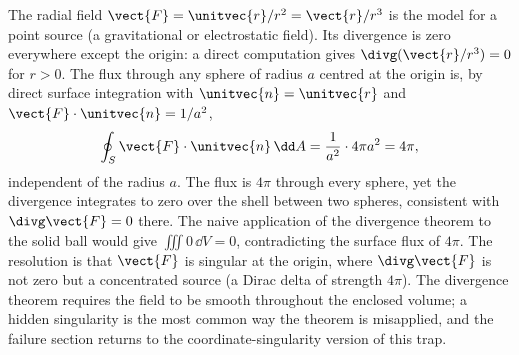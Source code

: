 \begin{example}
The radial field $\vect{F} = \unitvec{r}/r^{2} = \vect{r}/r^{3}$ is
the model for a point source (a gravitational or electrostatic field).
Its divergence is zero everywhere except the origin: a direct
computation gives $\divg(\vect{r}/r^{3}) = 0$ for $r > 0$. The flux
through any sphere of radius $a$ centred at the origin is, by direct
surface integration with $\unitvec{n} = \unitvec{r}$ and
$\vect{F}\cdot\unitvec{n} = 1/a^{2}$,
\[
\oint_{S}\vect{F}\cdot\unitvec{n}\,\dd A = \frac{1}{a^{2}}\cdot
4\pi a^{2} = 4\pi,
\]
independent of the radius $a$. The flux is $4\pi$ through every sphere,
yet the divergence integrates to zero over the shell between two
spheres, consistent with $\divg\vect{F} = 0$ there. The naive
application of the divergence theorem to the solid ball would give
$\iiint 0\,\dd V = 0$, contradicting the surface flux of $4\pi$. The
resolution is that $\vect{F}$ is singular at the origin, where
$\divg\vect{F}$ is not zero but a concentrated source (a Dirac delta
of strength $4\pi$). The divergence theorem requires the field to be
smooth throughout the enclosed volume; a hidden singularity is the
most common way the theorem is misapplied, and the failure section
returns to the coordinate-singularity version of this trap.
\end{example}

